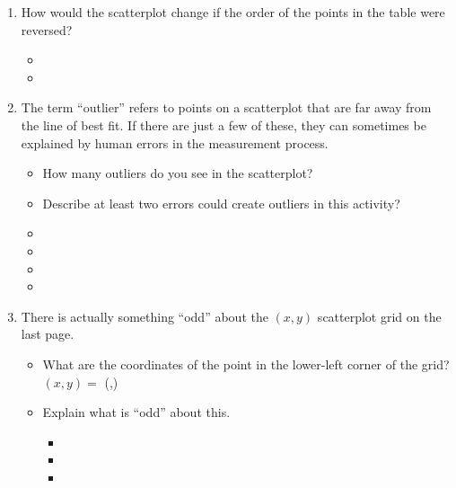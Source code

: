 \documentclass[12pt,letterpaper]{memoir}
\begin{document}
\begin{enumerate}[fullwidth,label={\Large$\bm{\square}$}\,\arabic*.,resume]
    \item How would the scatterplot change if the order of the points in the table 
        were reversed? \hrulefill 
        \begin{itemize}
            \item[]\hrulefill 
            \item[]\hrulefill 
        \end{itemize} 
    \item The term ``outlier'' refers to points on a scatterplot that are 
        far away from the line of best fit. 
        If there are just a few of these, they can sometimes be explained by 
        human errors in the measurement process. 
        \begin{itemize}
            \item How many outliers do you see in the scatterplot? \underline{\hspace{0.5in}}
            \item Describe at least two errors could create outliers in this activity?
            \item[]\hrulefill
            \item[]\hrulefill
            \item[]\hrulefill
            \item[]\hrulefill
        \end{itemize}
    \item There is actually something ``odd'' about the $(x,y)$ scatterplot grid  
        on the last page. 
        \begin{itemize}
            \item What are the coordinates of the point in the lower-left corner of the grid?
                $(x,y) = $ (\underline{\hspace{1em}},\underline{\hspace{1em}})
            \item Explain what is ``odd'' about this. \hrulefill
            \begin{itemize}
                \item[]\hrulefill
                \item[]\hrulefill
                \item[]\hrulefill
            \end{itemize}        \end{itemize} 
\end{enumerate}
\end{document}
